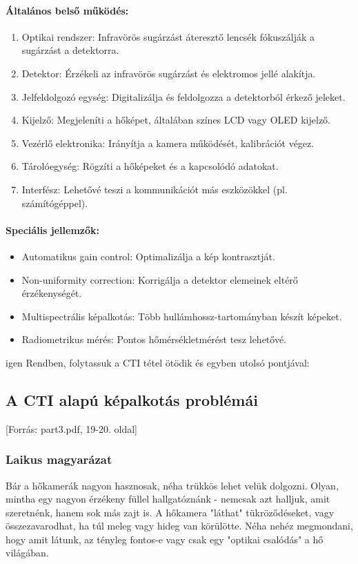 \documentclass[a4paper,12pt]{article}
\begin{document}
\paragraph{Általános belső működés:} \begin{enumerate} \item Optikai rendszer: Infravörös sugárzást áteresztő lencsék fókuszálják a sugárzást a detektorra. \item Detektor: Érzékeli az infravörös sugárzást és elektromos jellé alakítja. \item Jelfeldolgozó egység: Digitalizálja és feldolgozza a detektorból érkező jeleket. \item Kijelző: Megjeleníti a hőképet, általában színes LCD vagy OLED kijelző. \item Vezérlő elektronika: Irányítja a kamera működését, kalibrációt végez. \item Tárolóegység: Rögzíti a hőképeket és a kapcsolódó adatokat. \item Interfész: Lehetővé teszi a kommunikációt más eszközökkel (pl. számítógéppel). \end{enumerate}

\paragraph{Speciális jellemzők:} \begin{itemize} \item Automatikus gain control: Optimalizálja a kép kontrasztját. \item Non-uniformity correction: Korrigálja a detektor elemeinek eltérő érzékenységét. \item Multispectrális képalkotás: Több hullámhossz-tartományban készít képeket. \item Radiometrikus mérés: Pontos hőmérsékletmérést tesz lehetővé. \end{itemize}

igen
Rendben, folytassuk a CTI tétel ötödik és egyben utolsó pontjával:

\subsection{A CTI alapú képalkotás problémái} [Forrás: part3.pdf, 19-20. oldal]

\subsubsection{Laikus magyarázat} Bár a hőkamerák nagyon hasznosak, néha trükkös lehet velük dolgozni. Olyan, mintha egy nagyon érzékeny füllel hallgatóznánk - nemcsak azt halljuk, amit szeretnénk, hanem sok más zajt is. A hőkamera "láthat" tükröződéseket, vagy összezavarodhat, ha túl meleg vagy hideg van körülötte. Néha nehéz megmondani, hogy amit látunk, az tényleg fontos-e vagy csak egy "optikai csalódás" a hő világában.
\end{document}
